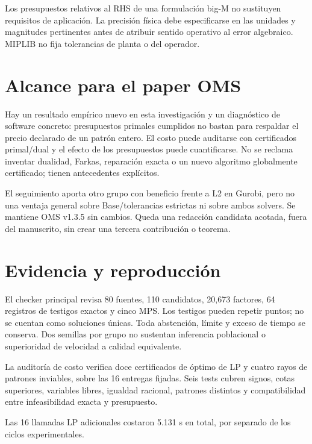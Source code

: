 \documentclass[10pt,a4paper]{article}
\begin{document}
Los presupuestos relativos al RHS de una formulación big-M no sustituyen
requisitos de aplicación. La precisión física debe especificarse en las
unidades y magnitudes pertinentes antes de atribuir sentido operativo
al error algebraico. MIPLIB no fija tolerancias de planta o del operador.
\newpage
\section*{Alcance para el paper OMS}
Hay un resultado empírico nuevo en esta investigación y un diagnóstico de
software concreto: presupuestos primales cumplidos no bastan para respaldar
el precio declarado de un patrón entero. El costo puede auditarse con
certificados primal/dual y el efecto de los presupuestos puede cuantificarse.
No se reclama inventar dualidad, Farkas, reparación exacta o un nuevo
algoritmo globalmente certificado; tienen antecedentes explícitos.

El seguimiento aporta otro grupo con beneficio frente a L2 en Gurobi,
pero no una ventaja general sobre Base/tolerancias estrictas ni sobre ambos
solvers. Se mantiene OMS v1.3.5 sin cambios. Queda una redacción candidata
acotada, fuera del manuscrito, sin crear una tercera contribución o teorema.
\section*{Evidencia y reproducción}
El checker principal revisa 80 fuentes, 110 candidatos, 20,673 factores,
64 registros de testigos exactos y cinco MPS. Los testigos pueden repetir
puntos; no se cuentan como soluciones únicas. Toda abstención, límite y
exceso de tiempo se conserva. Dos semillas por grupo no sustentan inferencia
poblacional o superioridad de velocidad a calidad equivalente.

La auditoría de costo verifica doce certificados de óptimo de LP y cuatro
rayos de patrones inviables, sobre las 16 entregas fijadas. Seis tests
cubren signos, cotas superiores, variables libres, igualdad racional,
patrones distintos y compatibilidad entre infeasibilidad exacta y presupuesto.

Las 16 llamadas LP adicionales costaron 5.131 s en total,
por separado de los ciclos experimentales.
\end{document}
